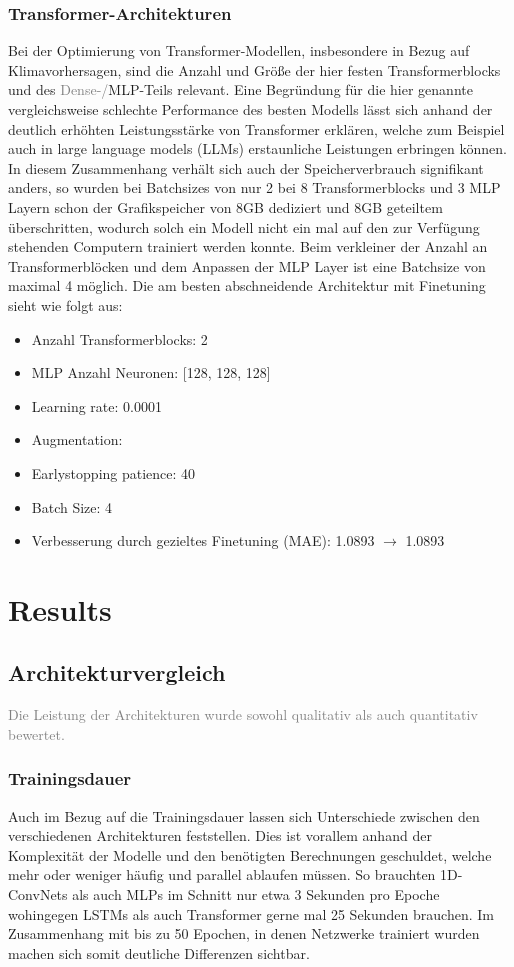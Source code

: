 \documentclass[manuscript,screen,review]{acmart} %
\begin{document}
\subsubsection*{Transformer-Architekturen}
Bei der Optimierung von Transformer-Modellen, insbesondere in Bezug auf Klimavorhersagen, sind die Anzahl und Größe der hier festen Transformerblocks und des \textcolor{gray}{Dense-/}MLP-Teils relevant.
Eine Begründung für die hier genannte vergleichsweise schlechte Performance des besten Modells lässt sich anhand der deutlich erhöhten Leistungsstärke von Transformer erklären, welche zum Beispiel auch in large language models (LLMs) erstaunliche Leistungen erbringen können.
In diesem Zusammenhang verhält sich auch der Speicherverbrauch signifikant anders, so wurden bei Batchsizes von nur 2 bei 8 Transformerblocks und 3 MLP Layern schon der Grafikspeicher von 8GB dediziert und 8GB geteiltem überschritten, wodurch solch ein Modell nicht ein mal auf den zur Verfügung stehenden Computern trainiert werden konnte. Beim verkleiner der Anzahl an Transformerblöcken und dem Anpassen der MLP Layer ist eine Batchsize von maximal 4 möglich.
Die am besten abschneidende Architektur mit Finetuning sieht wie folgt aus:
\begin{itemize}
    \item Anzahl Transformerblocks: 2
    \item MLP Anzahl Neuronen: [128, 128, 128]
    \item Learning rate: 0.0001
    \item Augmentation: 
    \item Earlystopping patience: 40
    \item Batch Size: 4
    \item Verbesserung durch gezieltes Finetuning (MAE): 1.0893 $\rightarrow$ 1.0893
\end{itemize}

\section{Results}

\subsection{Architekturvergleich}
\textcolor{gray}{Die Leistung der Architekturen wurde sowohl qualitativ als auch quantitativ bewertet.} 

\subsubsection{Trainingsdauer}
Auch im Bezug auf die Trainingsdauer lassen sich Unterschiede zwischen den verschiedenen Architekturen feststellen. 
Dies ist vorallem anhand der Komplexität der Modelle und den benötigten Berechnungen geschuldet, welche mehr oder weniger häufig und parallel ablaufen müssen.
So brauchten 1D-ConvNets als auch MLPs im Schnitt nur etwa 3 Sekunden pro Epoche wohingegen LSTMs als auch Transformer gerne mal 25 Sekunden brauchen.
Im Zusammenhang mit bis zu 50 Epochen, in denen Netzwerke trainiert wurden machen sich somit deutliche Differenzen sichtbar.
\end{document}

